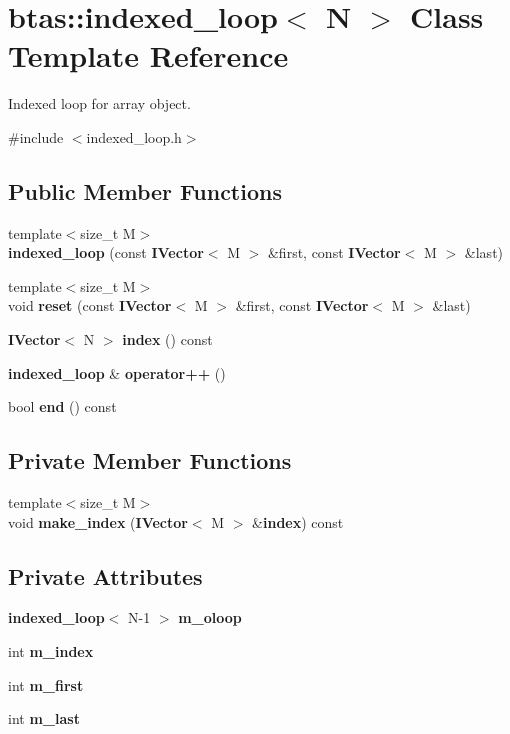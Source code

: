 \section{btas\-:\-:indexed\-\_\-loop$<$ N $>$ Class Template Reference}
\label{d4/d84/classbtas_1_1indexed__loop}


Indexed loop for array object.  




{\ttfamily \#include $<$indexed\-\_\-loop.\-h$>$}

\subsection*{Public Member Functions}
\begin{DoxyCompactItemize}
\item 
{\footnotesize template$<$size\-\_\-t M$>$ }\\{\bf indexed\-\_\-loop} (const {\bf I\-Vector}$<$ M $>$ \&first, const {\bf I\-Vector}$<$ M $>$ \&last)
\item 
{\footnotesize template$<$size\-\_\-t M$>$ }\\void {\bf reset} (const {\bf I\-Vector}$<$ M $>$ \&first, const {\bf I\-Vector}$<$ M $>$ \&last)
\item 
{\bf I\-Vector}$<$ N $>$ {\bf index} () const 
\item 
{\bf indexed\-\_\-loop} \& {\bf operator++} ()
\item 
bool {\bf end} () const 
\end{DoxyCompactItemize}
\subsection*{Private Member Functions}
\begin{DoxyCompactItemize}
\item 
{\footnotesize template$<$size\-\_\-t M$>$ }\\void {\bf make\-\_\-index} ({\bf I\-Vector}$<$ M $>$ \&{\bf index}) const 
\end{DoxyCompactItemize}
\subsection*{Private Attributes}
\begin{DoxyCompactItemize}
\item 
{\bf indexed\-\_\-loop}$<$ N-\/1 $>$ {\bf m\-\_\-oloop}
\item 
int {\bf m\-\_\-index}
\item 
int {\bf m\-\_\-first}
\item 
int {\bf m\-\_\-last}
\end{DoxyCompactItemize}
